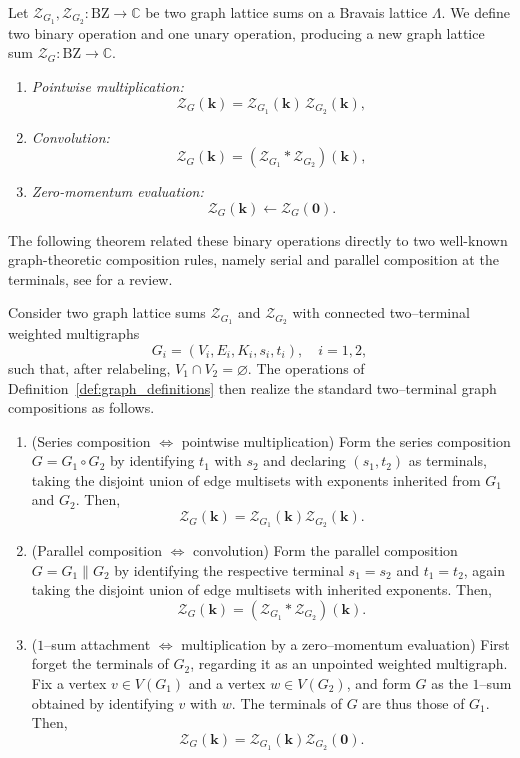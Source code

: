 \documentclass[]{amsart}
\numberwithin{mythm}{section}
\begin{document}
\begin{definition}
\label{def:graph_definitions}
 Let ${\mathcal Z}_{G_1},\mathcal Z_{G_2}:\mathrm{BZ}\to\mathds C$
be two graph lattice sums on a Bravais lattice $\Lambda$.  
We define two binary operation and one unary operation, producing a new graph lattice sum
$\mathcal Z_G:\mathrm{BZ}\to\mathds C$.

\begin{enumerate}
    \item \emph{Pointwise multiplication:}
    \[
      \mathcal Z_G(\bm k)=\mathcal Z_{G_1}(\bm k)\,\mathcal Z_{G_2}(\bm k),
    \]
    \item \emph{Convolution:}
    \[
      \mathcal Z_G(\bm k)=(\mathcal Z_{G_1}\ast \mathcal Z_{G_2})(\bm k),
    \]
    \item \emph{Zero-momentum evaluation:}
    \[
      \mathcal Z_G(\bm k)\leftarrow \mathcal Z_G(\bm 0).
    \]
\end{enumerate}
\end{definition}
The following theorem related these binary operations directly to two well-known graph-theoretic composition rules, namely serial and parallel composition at the terminals, see \cite[Sec.~8.3]{Bodlaender1998} for a review.
\begin{theorem}
\label{thm:zeta_vs_graph_ops_weighted}
Consider two graph lattice sums $\mathcal Z_{G_1}$ and $\mathcal Z_{G_2}$ 
with connected two--terminal weighted multigraphs
\[
G_i=(V_i,E_i,K_i,s_i,t_i),\quad i=1,2,
\]
such that, after relabeling, $V_1\cap V_2=\varnothing$.
 The operations of Definition~\ref{def:graph_definitions}
then realize the standard two--terminal graph compositions as follows.

\begin{enumerate}
\item[\textup{(i)}] \textup{(Series composition $\Leftrightarrow$ pointwise multiplication)}
Form the series composition $G=G_1\circ G_2$ by identifying $t_1$ with
$s_2$ and declaring $(s_1,t_2)$ as terminals,  taking the disjoint union of
edge multisets with
exponents inherited from $G_1$ and $G_2$. Then,
\[
\mathcal Z_{G}(\bm k)=\mathcal Z_{G_1}(\bm k) \mathcal Z_{G_2}(\bm k).
\]
\item[\textup{(ii)}] \textup{(Parallel composition $\Leftrightarrow$ convolution)}
Form the parallel composition $G=G_1\parallel G_2$ by identifying the respective terminal $s_1=s_2$ and $t_1=t_2$,
 again taking the disjoint union of edge multisets with inherited exponents. Then, 
\[
\mathcal Z_{G}(\bm k)=(\mathcal Z_{G_1}\ast\mathcal Z_{G_2})(\bm k).
\]
\item[\textup{(iii)}] \textup{($1$--sum attachment $\Leftrightarrow$
multiplication by a zero--momentum evaluation)}
First forget the terminals of $G_2$, regarding it as an unpointed weighted
multigraph.  Fix a vertex $v\in V(G_1)$ and a vertex $w\in V(G_2)$, and form
$G$ as the $1$--sum obtained by identifying $v$ with $w$.  
The terminals of $G$ are thus those of $G_1$.
Then, 
\[
\mathcal Z_G(\bm k)=\mathcal Z_{G_1}(\bm k)\mathcal Z_{G_2}(\bm 0).
\]
\end{enumerate}
\end{theorem}
\end{document}
